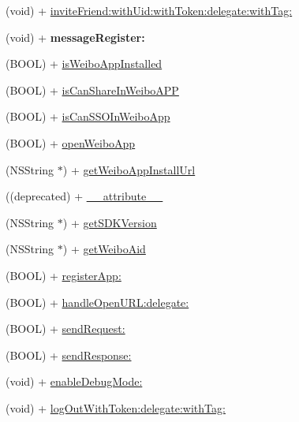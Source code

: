 \begin{DoxyCompactItemize}
(void) + \mbox{\hyperlink{interface_weibo_s_d_k_a12e37cf863202654e615232885fa596f}{invite\+Friend\+:with\+Uid\+:with\+Token\+:delegate\+:with\+Tag\+:}}
\item 
\mbox{\label{interface_weibo_s_d_k_afd33ff21d39c13140c2c2d3f69d368ce}} 
(void) + {\bfseries message\+Register\+:}
\item 
(B\+O\+OL) + \mbox{\hyperlink{interface_weibo_s_d_k_af88507558450c5e2f390ecf8fb157071}{is\+Weibo\+App\+Installed}}
\item 
(B\+O\+OL) + \mbox{\hyperlink{interface_weibo_s_d_k_aa32c8c6bf4847f6cdc134cec9955f3d2}{is\+Can\+Share\+In\+Weibo\+A\+PP}}
\item 
(B\+O\+OL) + \mbox{\hyperlink{interface_weibo_s_d_k_adc233f097b5c5e0d99ebc326ffd2548a}{is\+Can\+S\+S\+O\+In\+Weibo\+App}}
\item 
(B\+O\+OL) + \mbox{\hyperlink{interface_weibo_s_d_k_aab11f361fa5ac787f89fdf8621d160bc}{open\+Weibo\+App}}
\item 
(N\+S\+String $\ast$) + \mbox{\hyperlink{interface_weibo_s_d_k_a49504103f9378dcde673b4c6b52b71e3}{get\+Weibo\+App\+Install\+Url}}
\item 
((deprecated) + \mbox{\hyperlink{interface_weibo_s_d_k_a40d5808e5f4f3957ef8255baeaa3c484}{\+\_\+\+\_\+attribute\+\_\+\+\_\+}}
\item 
(N\+S\+String $\ast$) + \mbox{\hyperlink{interface_weibo_s_d_k_a691f8c3d5605163a7873eb0dbc754f79}{get\+S\+D\+K\+Version}}
\item 
(N\+S\+String $\ast$) + \mbox{\hyperlink{interface_weibo_s_d_k_aec605d5ae27958199c450a8eda005298}{get\+Weibo\+Aid}}
\item 
(B\+O\+OL) + \mbox{\hyperlink{interface_weibo_s_d_k_ae11cd35ddd3b8ab9f0dea249e830aa72}{register\+App\+:}}
\item 
(B\+O\+OL) + \mbox{\hyperlink{interface_weibo_s_d_k_a4a0d371f214612aa4c31ff1096796203}{handle\+Open\+U\+R\+L\+:delegate\+:}}
\item 
(B\+O\+OL) + \mbox{\hyperlink{interface_weibo_s_d_k_a765c7577fb1d6bf1e4ebf0ecdd4f6268}{send\+Request\+:}}
\item 
(B\+O\+OL) + \mbox{\hyperlink{interface_weibo_s_d_k_af0a51ae27b64cf65bba05a1ea9c5d6e5}{send\+Response\+:}}
\item 
(void) + \mbox{\hyperlink{interface_weibo_s_d_k_a34fc58188a69b4585b4f49cda4f3cc17}{enable\+Debug\+Mode\+:}}
\item 
(void) + \mbox{\hyperlink{interface_weibo_s_d_k_aaa71820983aaf80d9893dd313ba0ceb9}{log\+Out\+With\+Token\+:delegate\+:with\+Tag\+:}}

\end{DoxyCompactItemize}
